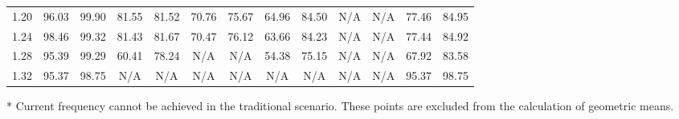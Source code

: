 \documentclass[prodmode,acmtrets]{acmsmall} %
\begin{document}
\begin{table}[tbp]
{\begin{threeparttable}
\begin{tabular}{|c|cc|cc|cc|cc|cc||cc|}
     1.20 & 96.03	& 99.90   & 81.55 &	81.52 &	 70.76 &	75.67 &	 64.96 &	 84.50  &	 N/A\tnote{*}	  & N/A\tnote{*} & 77.46 & 84.95 \\
     1.24 & 98.46	& 99.32   & 81.43 &	81.67 &	 70.47 &	76.12 &	 63.66 &	 84.23  &	 N/A\tnote{*}	  & N/A\tnote{*} & 77.44 & 84.92\\
     1.28 & 95.39	& 99.29   & 60.41 &	78.24 &	 N/A\tnote{*}	    &   N/A\tnote{*}     &	54.38 &	 75.15  &	 N/A\tnote{*}	  & N/A\tnote{*} & 67.92 & 83.58\\
     1.32 & 95.37	& 98.75   & N/A\tnote{*}	  &	 N/A\tnote{*}	    &	 N/A\tnote{*}	    &	 N/A\tnote{*}   & N/A\tnote{*}   & N/A\tnote{*}    &    N/A\tnote{*}   & N/A\tnote{*} & 95.37	& 98.75 \\
     \hline
   \end{tabular}
   \normalsize
   \begin{tablenotes}
   \scriptsize
    \item[*] Current frequency cannot be achieved in the traditional scenario. These points are excluded from the calculation of geometric means.
   \end{tablenotes}
   \end{threeparttable}}
   \label{Table:Ratio_MRE}
 \end{table}
\end{document}
